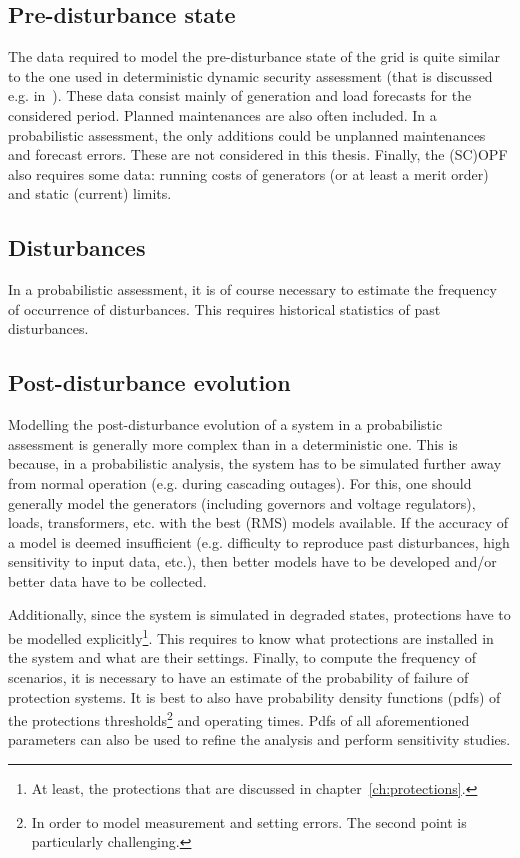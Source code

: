 \subsection{Pre-disturbance state}

The data required to model the pre-disturbance state of the grid is quite similar to the one used in deterministic dynamic security assessment (that is discussed e.g. in~\cite{EurostagHPC}). These data consist mainly of generation and load forecasts for the considered period. Planned maintenances are also often included. In a probabilistic assessment, the only additions could be unplanned maintenances and forecast errors. These are not considered in this thesis. Finally, the (SC)OPF also requires some data: running costs of generators (or at least a merit order) and static (current) limits.

\subsection{Disturbances}

In a probabilistic assessment, it is of course necessary to estimate the frequency of occurrence of disturbances. This requires historical statistics of past disturbances.

\subsection{Post-disturbance evolution}

Modelling the post-disturbance evolution of a system in a probabilistic assessment is generally more complex than in a deterministic one. This is because, in a probabilistic analysis, the system has to be simulated further away from normal operation (e.g. during cascading outages). For this, one should generally model the generators (including governors and voltage regulators), loads, transformers, etc. with the best (RMS) models available. If the accuracy of a model is deemed insufficient (e.g. difficulty to reproduce past disturbances, high sensitivity to input data, etc.), then better models have to be developed and/or better data have to be collected.

Additionally, since the system is simulated in degraded states, protections have to be modelled explicitly\footnote{At least, the protections that are discussed in chapter~\ref{ch:protections}.}. This requires to know what protections are installed in the system and what are their settings. Finally, to compute the frequency of scenarios, it is necessary to have an estimate of the probability of failure of protection systems. It is best to also have probability density functions (pdfs) of the protections thresholds\footnote{In order to model measurement and setting errors. The second point is particularly challenging.} and operating times. Pdfs of all aforementioned parameters can also be used to refine the analysis and perform sensitivity studies.

